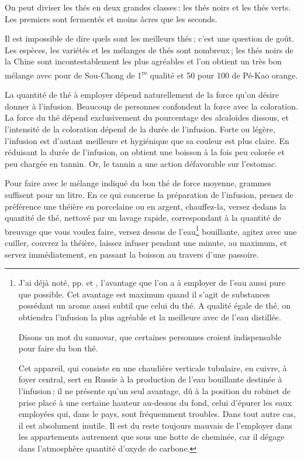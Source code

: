 On peut diviser les thés en deux grandes classes : les thés noirs et les thés
verts. Les premiers sont fermentés et moins âcres que les seconds.

Il est impossible de dire quels sont les meilleurs thés ; c'est une question de
goût. Les espèces, les variétés et les mélanges de thés sont nombreux ; les
thés noirs de la Chine sont incontestablement les plus agréables et l'on
obtient un très bon mélange avec {\mmm} pour {\mmm} de Sou-Chong
de 1\textsuperscript{re} qualité et 50 pour 100 de Pé-Kao orange.

La quantité de thé à employer dépend naturellement de la force qu'on désire
donner à l'infusion. Beaucoup de personnes confondent la force avec la
coloration. La force du thé dépend exclusivement du pourcentage des alcaloïdes
dissous, et l'intensité de la coloration dépend de la durée de l'infusion.
Forte ou légère, l'infusion est d'autant meilleure et hygiénique que sa couleur
est plus claire. En réduisant la durée de l'infusion, on obtient une boisson
à la fois peu colorée et peu chargée en tannin. Or, le tannin a une action
défavorable sur l'estomac.

Pour faire avec le mélange indiqué du bon thé de force moyenne, {\mmm}
grammes suffisent pour un litre. En ce qui concerne la préparation de
l'infusion, prenez de préférence une théière en porcelaine ou en argent,
chauffez-la, versez dedans la quantité de thé, nettové par un lavage rapide,
correspondant à la quantité de breuvage que vous voulez faire, versez dessus de
l'eau\footnote{J'ai déjà noté, pp. \hyperlink{p0199}{\pageref{pg0199}} et
\hyperlink{p1014}{\pageref{pg1014}}, l'avantage que l'on a à employer de
l'eau aussi pure que possible. Cet avantage est maximum quand il s'agit de
substances possédant un arome aussi subtil que celui du thé. A qualité égale de
thé, on obtiendra l'infusion la plus agréable et la meilleure avec de l'eau
distillée. \protect

Disons un mot du samovar, que certaines personnes croient indispensable pour
faire du bon thé. \protect

Cet appareil, qui consiste en une chaudière verticale tubulaire, en cuivre,
à foyer central, sert en Russie à la production de l’eau bouillante destinée
à l'infusion ; il ne présente qu'un seul avantage, dû à la position du robinet
de prise placé à une certaine hauteur au-dessus du fond, celui d'épurer les
eaux employées qui, dans le pays, sont fréquemment troubles. Dans tout autre
cas, il est absolument inutile. Il est du reste toujours mauvais de l'employer
dans les appartements autrement que sous une hotte de cheminée, car il dégage
dans l'atmosphère quantité d'oxyde de carbone.} bouillante, agitez avec une
cuiller, couvrez la théière, laissez infuser pendant une minute, au maximum, et
servez immédiatement, en passant la boisson au travers d'une passoire.

